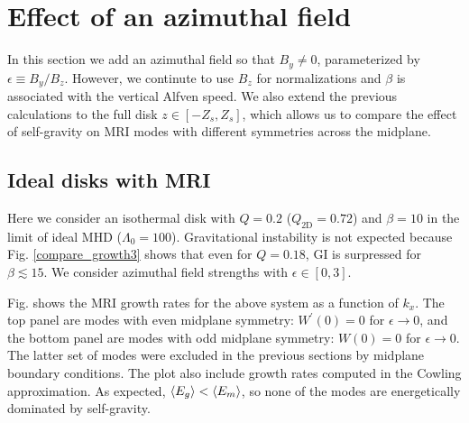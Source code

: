 \section{Effect of an azimuthal field}\label{result3}
In this section we add an azimuthal field so that $B_y\neq 0$,  
parameterized by $\epsilon \equiv B_y/B_z$. However, we continute to
use $B_z$ for normalizations and $\beta$ is associated with the
vertical Alfven speed. We also extend the previous calculations to the
full disk $z\in[-Z_s,Z_s]$, which allows us to compare the effect of
self-gravity on MRI modes with different symmetries across the
midplane. 

\subsection{Ideal disks with MRI} 
Here we consider an isothermal disk with $Q=0.2$
($Q_\mathrm{2D}=0.72$) and $\beta=10$ in the limit of ideal MHD
($\Lambda_0=100$). Gravitational instability is not expected because 
Fig. \ref{compare_growth3} shows that even for $Q=0.18$, GI is 
surpressed for $\beta \lesssim 15$. We consider azimuthal field
strengths with $\epsilon\in[0,3]$. 

Fig. shows the MRI growth rates for the above system as a function of
$k_x$. The top panel are modes with even midplane symmetry: 
$W^\prime(0)= 0$ for $\epsilon\to0$, and the bottom panel are modes with odd midplane 
symmetry: $W(0) = 0$ for $\epsilon\to0$. The latter set of modes were 
excluded in the previous sections by midplane boundary 
conditions. The plot also include growth rates computed in the Cowling
approximation. As expected,  $\langle{E_g}\rangle<\langle{E_m}\rangle$, so none of the
modes are energetically dominated by self-gravity. 




